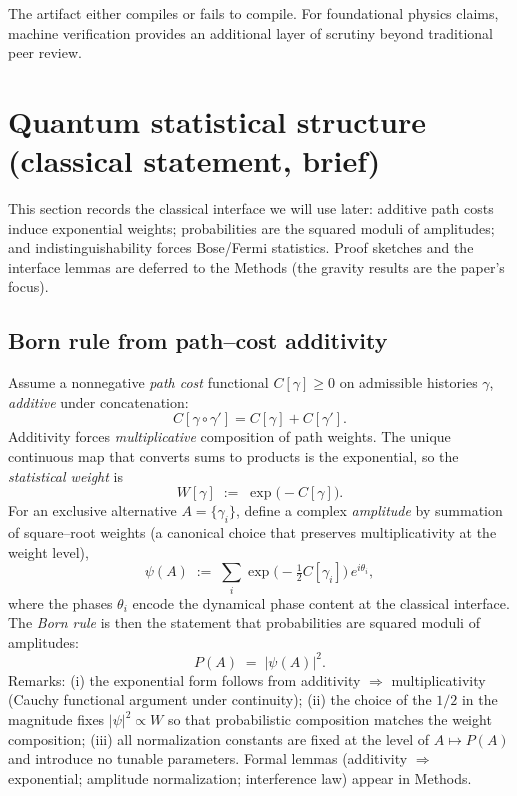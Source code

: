 \documentclass[11pt]{article}
\begin{document}
The artifact either compiles or fails to compile. For foundational physics claims, machine verification provides an additional layer of scrutiny beyond traditional peer review.

\section{Quantum statistical structure (classical statement, brief)}
\label{sec:quantum-structure}

This section records the classical interface we will use later: additive path costs induce exponential weights; probabilities are the squared moduli of amplitudes; and indistinguishability forces Bose/Fermi statistics. Proof sketches and the interface lemmas are deferred to the Methods (the gravity results are the paper's focus).

\subsection{Born rule from path--cost additivity}
\label{subsec:born-additivity}

Assume a nonnegative \emph{path cost} functional $C[\gamma]\ge 0$ on admissible histories $\gamma$, \emph{additive} under concatenation:
\[
C[\gamma\circ\gamma']=C[\gamma]+C[\gamma'].
\]
Additivity forces \emph{multiplicative} composition of path weights. The unique continuous map that converts sums to products is the exponential, so the \emph{statistical weight} is
\[
W[\gamma]\;:=\;\exp\!\big(-C[\gamma]\big).
\]
For an exclusive alternative $A=\{\gamma_i\}$, define a complex \emph{amplitude} by summation of square–root weights (a canonical choice that preserves multiplicativity at the weight level),
\[
\psi(A)\;:=\;\sum_i \exp\!\Big(-\tfrac{1}{2}C[\gamma_i]\Big)\,e^{i\theta_i},
\]
where the phases $\theta_i$ encode the dynamical phase content at the classical interface. The \emph{Born rule} is then the statement that probabilities are squared moduli of amplitudes:
\[
P(A)\;=\;|\psi(A)|^2.
\]
Remarks: (i) the exponential form follows from additivity $\Rightarrow$ multiplicativity (Cauchy functional argument under continuity); (ii) the choice of the $1/2$ in the magnitude fixes $|\psi|^2\propto W$ so that probabilistic composition matches the weight composition; (iii) all normalization constants are fixed at the level of $A\mapsto P(A)$ and introduce no tunable parameters. Formal lemmas (additivity $\Rightarrow$ exponential; amplitude normalization; interference law) appear in Methods.
\end{document}
